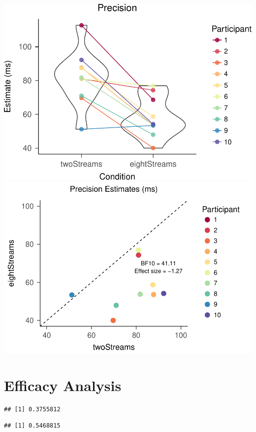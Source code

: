 \documentclass[,man]{apa6}
\begin{document}
\includegraphics{nStreams_Bayesian_files/figure-latex/unnamed-chunk-4-1.pdf}
\includegraphics{nStreams_Bayesian_files/figure-latex/unnamed-chunk-4-2.pdf}

\section{Efficacy Analysis}\label{efficacy-analysis}

\begin{verbatim}
## [1] 0.3755812
\end{verbatim}

\begin{verbatim}
## [1] 0.5468815
\end{verbatim}
\end{document}
